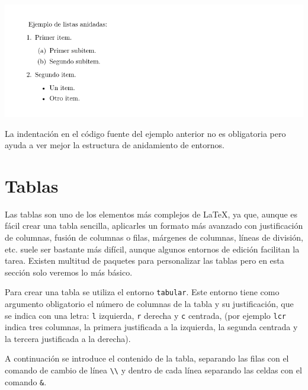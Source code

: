 \documentclass[
  letterpaper,
  DIV=11,
  numbers=noendperiod]{scrreport}
\begin{document}
\begin{tcolorbox}[enhanced jigsaw, arc=.35mm, toprule=.15mm, opacitybacktitle=0.6, colback=white, coltitle=black, colbacktitle=quarto-callout-note-color!10!white, breakable, colframe=quarto-callout-note-color-frame, left=2mm, opacityback=0, bottomtitle=1mm, toptitle=1mm, titlerule=0mm, title={Salida}, bottomrule=.15mm, leftrule=.75mm, rightrule=.15mm]
\includegraphics{./img/listas/listas-anidadas.png}
\end{tcolorbox}

La indentación en el código fuente del ejemplo anterior no es
obligatoria pero ayuda a ver mejor la estructura de anidamiento de
entornos.


\hypertarget{sec-tablas}{%
\chapter{Tablas}\label{sec-tablas}}

Las tablas son uno de los elementos más complejos de \LaTeX, ya que,
aunque es fácil crear una tabla sencilla, aplicarles un formato más
avanzado con justificación de columnas, fusión de columnas o filas,
márgenes de columnas, líneas de división, etc. suele ser bastante más
difícil, aunque algunos entornos de edición facilitan la tarea. Existen
multitud de paquetes para personalizar las tablas pero en esta sección
solo veremos lo más básico.

Para crear una tabla se utiliza el entorno \texttt{tabular}. Este
entorno tiene como argumento obligatorio el número de columnas de la
tabla y su justificación, que se indica con una letra: \texttt{l}
izquierda, \texttt{r} derecha y \texttt{c} centrada, (por ejemplo
\texttt{lcr} indica tres columnas, la primera justificada a la
izquierda, la segunda centrada y la tercera justificada a la derecha).

A continuación se introduce el contenido de la tabla, separando las
filas con el comando de cambio de línea
\texttt{\textbackslash{}\textbackslash{}} y dentro de cada línea
separando las celdas con el comando \texttt{\&}.
\end{document}
